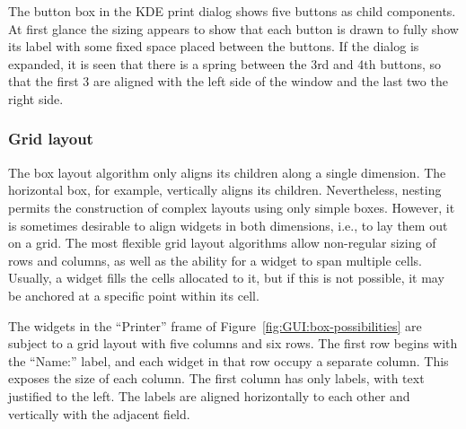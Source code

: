 The button box in the KDE print dialog shows five buttons as child
components. At first glance the sizing appears to show that each
button is drawn to fully show its label with some fixed space placed
between the buttons. If the dialog is expanded, it is seen that there
is a spring between the 3rd and 4th buttons, so that the first 3 are
aligned with the left side of the window and the last two the right
side.

\subsubsection{Grid layout}
\label{sec:GUI:grid-layout}

The box layout algorithm only aligns its children along a single
dimension. The horizontal box, for example, vertically aligns its
children. Nevertheless, nesting permits the construction of complex
layouts using only simple boxes. However, it is sometimes desirable to
align widgets in both dimensions, i.e., to lay them out on a
grid. The
most flexible grid layout algorithms allow non-regular sizing of rows
and columns, as well as the ability for a widget to span multiple
cells. Usually, a widget fills the cells allocated to it, but if this
is not possible, it may be anchored at a specific point within its
cell. 

The widgets in the ``Printer'' frame of
Figure~\ref{fig:GUI:box-possibilities} are subject to a grid layout
with five columns and six rows. The first row begins with the
``Name:'' label, and each widget in that row occupy a separate
column. This exposes the size of each column. The first column has
only labels, with text justified to the left.  The labels are aligned
horizontally to each other and vertically with the adjacent field.













